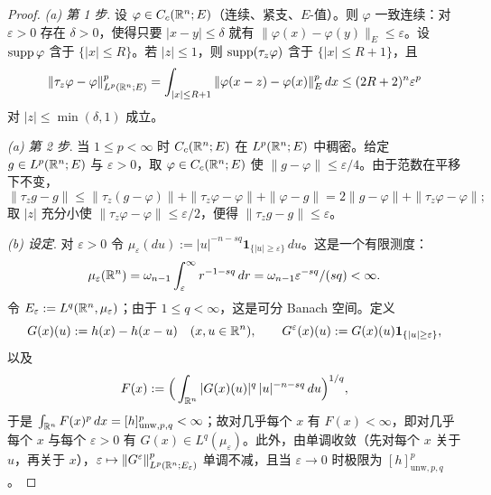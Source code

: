 \begin{proof}
\emph{(a) 第 1 步}. 设 $\varphi\in C_c(\mathbb{R}^n;E)$（连续、紧支、$E$-值）。则 $\varphi$ 一致连续：对 $\varepsilon>0$ 存在 $\delta>0$，使得只要 $|x-y|\le\delta$ 就有 $\|\varphi(x)-\varphi(y)\|_E\le\varepsilon$。设 $\operatorname{supp}\varphi$ 含于 $\{|x|\le R\}$。若 $|z|\le1$，则 $\operatorname{supp}(\tau_z\varphi)$ 含于 $\{|x|\le R+1\}$，且
\[
  \|\tau_z\varphi-\varphi\|_{L^p(\mathbb{R}^n;E)}^p=\int_{|x|\le R+1}\|\varphi(x-z)-\varphi(x)\|_E^p\,dx\le(2R+2)^n\varepsilon^p
\]
对 $|z|\le\min(\delta,1)$ 成立。

\emph{(a) 第 2 步}. 当 $1\le p<\infty$ 时 $C_c(\mathbb{R}^n;E)$ 在 $L^p(\mathbb{R}^n;E)$ 中稠密。给定 $g\in L^p(\mathbb{R}^n;E)$ 与 $\varepsilon>0$，取 $\varphi\in C_c(\mathbb{R}^n;E)$ 使 $\|g-\varphi\|\le\varepsilon/4$。由于范数在平移下不变，
\[
  \|\tau_zg-g\|\le\|\tau_z(g-\varphi)\|+\|\tau_z\varphi-\varphi\|+\|\varphi-g\|=2\|g-\varphi\|+\|\tau_z\varphi-\varphi\|;
\]
取 $|z|$ 充分小使 $\|\tau_z\varphi-\varphi\|\le\varepsilon/2$，便得 $\|\tau_zg-g\|\le\varepsilon$。

\emph{(b) 设定}. 对 $\varepsilon>0$ 令 $\mu_\varepsilon(du):=|u|^{-n-sq}\mathbf{1}_{\{|u|\ge\varepsilon\}}\,du$。这是一个有限测度：
\[
  \mu_\varepsilon(\mathbb{R}^n)=\omega_{n-1}\int_\varepsilon^\infty r^{-1-sq}\,dr=\omega_{n-1}\varepsilon^{-sq}/(sq)<\infty .
\]
令 $E_\varepsilon:=L^q(\mathbb{R}^n,\mu_\varepsilon)$；由于 $1\le q<\infty$，这是可分 Banach 空间。定义
\[
  G(x)(u):=h(x)-h(x-u)\quad(x,u\in\mathbb{R}^n),\qquad G^\varepsilon(x)(u):=G(x)(u)\mathbf{1}_{\{|u|\ge\varepsilon\}},
\]
以及
\[
  F(x):=\Big(\int_{\mathbb{R}^n}|G(x)(u)|^q\,|u|^{-n-sq}\,du\Big)^{1/q},
\]
于是 $\int_{\mathbb{R}^n}F(x)^p\,dx=[h]_{\mathrm{unw},p,q}^p<\infty$；故对几乎每个 $x$ 有 $F(x)<\infty$，即对几乎每个 $x$ 与每个 $\varepsilon>0$ 有 $G(x)\in L^q(\mu_\varepsilon)$。此外，由单调收敛（先对每个 $x$ 关于 $u$，再关于 $x$），$\varepsilon\mapsto\|G^\varepsilon\|_{L^p(\mathbb{R}^n;E_\varepsilon)}^p$ 单调不减，且当 $\varepsilon\to0$ 时极限为 $[h]_{\mathrm{unw},p,q}^p$。


\end{proof}
